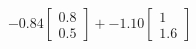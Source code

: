 \documentclass[preview]{standalone}
\begin{document}
\begin{align*}
-0.84 \begin{bmatrix} 0.8 \\ 0.5 \end{bmatrix} + -1.10 \begin{bmatrix} 1 \\ 1.6 \end{bmatrix}
\end{align*}
\end{document}
